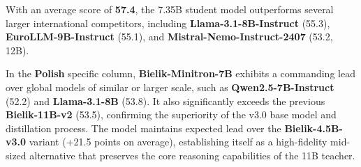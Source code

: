 \documentclass{article}
\begin{document}
With an average score of \textbf{57.4}, the 7.35B student model outperforms several larger international competitors, including \textbf{Llama-3.1-8B-Instruct} (55.3), \textbf{EuroLLM-9B-Instruct} (55.1), and \textbf{Mistral-Nemo-Instruct-2407} (53.2, 12B). 

In the \textbf{Polish} specific column, \textbf{Bielik-Minitron-7B} exhibits a commanding lead over global models of similar or larger scale, such as \textbf{Qwen2.5-7B-Instruct} (52.2) and \textbf{Llama-3.1-8B} (53.8). It also significantly exceeds the previous \textbf{Bielik-11B-v2} (53.5), confirming the superiority of the v3.0 base model and distillation process. The model maintains expected lead over the \textbf{Bielik-4.5B-v3.0} variant (+21.5 points on average), establishing itself as a high-fidelity mid-sized alternative that preserves the core reasoning capabilities of the 11B teacher.
\end{document}
